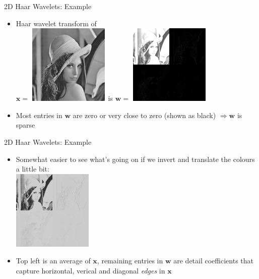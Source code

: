 \documentclass[xcolor=table]{beamer}
\numberwithin{equation}{section}
\let\bs\boldsymbol
\begin{document}
\begin{frame}{2D Haar Wavelets: Example}
\begin{itemize}%
\item Haar wavelet transform of\\
$\bs x = $ \includegraphics[width=1.5in]{512.png}\, is $\bs w = $ \includegraphics[width=1.5in]{lennaHaar.png}
\item Most entries in $\bs w$ are zero or very close to zero (shown as black) $\Rightarrow \bs w$ is sparse
\end{itemize}
\end{frame}

\begin{frame}{2D Haar Wavelets: Example}
\begin{itemize}%
\item Somewhat easier to see what's going on if we invert and translate the colours a little bit:\\
\hspace{1.2in}  \includegraphics[width=1.5in]{lennaHaarInv.png}
\item Top left is an average of $\bs x$, remaining entries in $\bs w$ are detail coefficients that capture horizontal, verical and diagonal \emph{edges} in $\bs x$ 
\end{itemize}
\end{frame}
\end{document}
